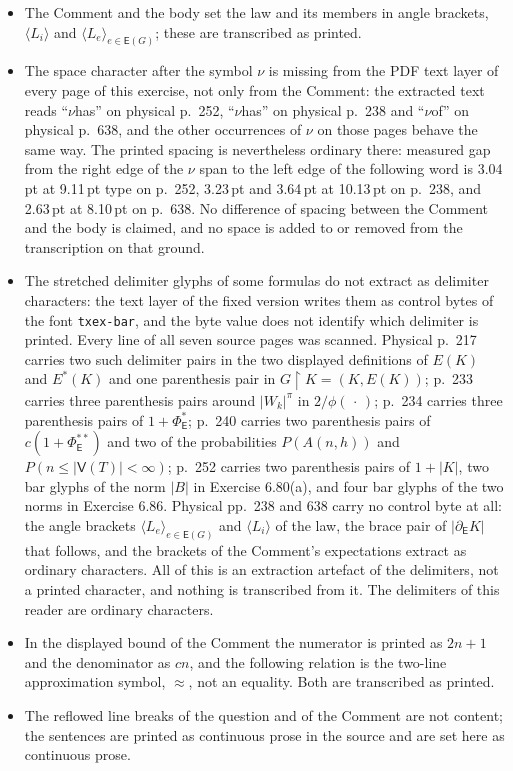 \documentclass[11pt]{article}
\newcommand{\V}{\mathsf V}
\newcommand{\E}{\mathsf E}
\begin{document}
\begin{itemize}
\item The Comment and the body set the law and its members in angle brackets, $\langle L_{i}\rangle$ and $\langle L_{e}\rangle_{e\in\E(G)}$; these are transcribed as printed.
\item The space character after the symbol $\nu$ is missing from the PDF text layer of every page of this exercise, not only from the Comment: the extracted text reads ``$\nu$has'' on physical p.\ 252, ``$\nu$has'' on physical p.\ 238 and ``$\nu$of'' on physical p.\ 638, and the other occurrences of $\nu$ on those pages behave the same way. The printed spacing is nevertheless ordinary there: measured gap from the right edge of the $\nu$ span to the left edge of the following word is 3.04\,pt at 9.11\,pt type on p.\ 252, 3.23\,pt and 3.64\,pt at 10.13\,pt on p.\ 238, and 2.63\,pt at 8.10\,pt on p.\ 638. No difference of spacing between the Comment and the body is claimed, and no space is added to or removed from the transcription on that ground.
\item The stretched delimiter glyphs of some formulas do not extract as delimiter characters: the text layer of the fixed version writes them as control bytes of the font \texttt{txex-bar}, and the byte value does not identify which delimiter is printed. Every line of all seven source pages was scanned. Physical p.\ 217 carries two such delimiter pairs in the two displayed definitions of $E(K)$ and $E^{*}(K)$ and one parenthesis pair in $G\!\restriction\!K=(K,E(K))$; p.\ 233 carries three parenthesis pairs around $|W_{k}|^{\pi}$ in $2/\phi(\,\cdot\,)$; p.\ 234 carries three parenthesis pairs of $1+\Phi^{*}_{\E}$; p.\ 240 carries two parenthesis pairs of $c(1+\Phi^{**}_{\E})$ and two of the probabilities $P(A(n,h))$ and $P(n\le|\V(T)|<\infty)$; p.\ 252 carries two parenthesis pairs of $1+|K|$, two bar glyphs of the norm $|B|$ in Exercise 6.80(a), and four bar glyphs of the two norms in Exercise 6.86. Physical pp.\ 238 and 638 carry no control byte at all: the angle brackets $\langle L_{e}\rangle_{e\in\E(G)}$ and $\langle L_{i}\rangle$ of the law, the brace pair of $|\partial_{\E}K|$ that follows, and the brackets of the Comment's expectations extract as ordinary characters. All of this is an extraction artefact of the delimiters, not a printed character, and nothing is transcribed from it. The delimiters of this reader are ordinary characters.
\item In the displayed bound of the Comment the numerator is printed as $2n+1$ and the denominator as $cn$, and the following relation is the two-line approximation symbol, $\approx$, not an equality. Both are transcribed as printed.
\item The reflowed line breaks of the question and of the Comment are not content; the sentences are printed as continuous prose in the source and are set here as continuous prose.
\end{itemize}
\end{document}
